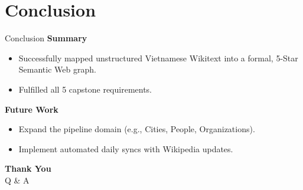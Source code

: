 \documentclass[aspectratio=169]{beamer}
\begin{document}
\section{Conclusion}
\begin{frame}{Conclusion}
    \textbf{Summary}
    \begin{itemize}
        \item Successfully mapped unstructured Vietnamese Wikitext into a formal, 5-Star Semantic Web graph.
        \item Fulfilled all 5 capstone requirements.
    \end{itemize}
    
    \vspace{0.3cm}
    \textbf{Future Work}
    \begin{itemize}
        \item Expand the pipeline domain (e.g., Cities, People, Organizations).
        \item Implement automated daily syncs with Wikipedia updates.
    \end{itemize}
\end{frame}

\begin{frame}
    \begin{center}
        \Huge \textbf{Thank You} \\
        \vspace{0.5cm}
        \Large Q \& A
    \end{center}
\end{frame}
\end{document}

